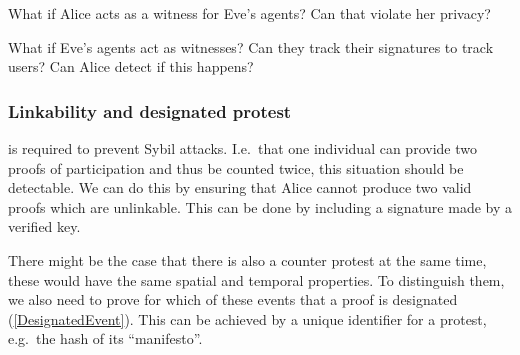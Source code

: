 \begin{question}
  What if Alice acts as a witness for Eve's agents?
  Can that violate her privacy?
\end{question}
\begin{question}
  What if Eve's agents act as witnesses?
  Can they track their signatures to track users?
  Can Alice detect if this happens?
\end{question}

\subsubsection{Linkability and designated protest}

 is required to prevent Sybil attacks.
I.e.\ that one individual can provide two proofs of participation and thus be 
counted twice, this situation should be detectable.
We can do this by ensuring that Alice cannot produce two valid proofs which
are unlinkable.
This can be done by including a signature made by a verified key.

There might be the case that there is also a counter protest at the same time, 
these would have the same spatial and temporal properties.
To distinguish them, we also need to prove for which of these events that a 
proof is designated (\cref{DesignatedEvent}).
This can be achieved by a unique identifier for a protest, e.g.\ the hash of 
its \enquote{manifesto}.


